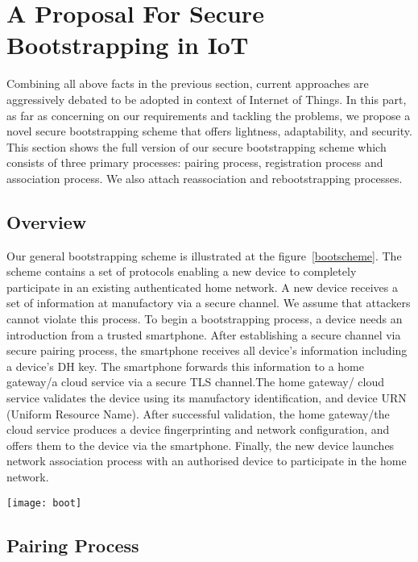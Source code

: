 \section{A Proposal For Secure Bootstrapping in IoT}\label{proposal}

Combining all above facts in the previous section, current approaches are aggressively debated to be adopted in context of Internet of Things. In this part, as far as concerning on our requirements and tackling the problems, we propose a novel secure bootstrapping scheme that offers lightness, adaptability,  and security. This section shows the full version of our secure bootstrapping scheme which consists of three primary processes: pairing process, registration process and association process. We also attach reassociation and rebootstrapping processes.
 
\subsection{Overview}

Our general bootstrapping scheme is illustrated at the figure~\ref{bootscheme}. The scheme contains a set of protocols enabling a new device to completely participate in an existing authenticated home network. A new device receives a set of information at manufactory via a secure channel. We assume that attackers cannot violate this process. To begin a bootstrapping process, a device needs an introduction from a trusted smartphone. After establishing a secure channel via secure pairing process, the smartphone receives all device's information including a device's DH key. The smartphone forwards this information to a home gateway/a cloud service via a secure TLS channel.The home gateway/ cloud service validates the device using its manufactory identification, and device URN (Uniform Resource Name). After successful validation, the home gateway/the cloud service produces a device fingerprinting and network configuration, and offers them to the device via the smartphone. Finally, the new device launches network association process with an authorised device to participate in the home network. 

\begin{figure*}
  \centering
  \texttt{[image: boot]}
  \caption{Secure Bootstrapping Scheme}
  \label{bootscheme}
\end{figure*}

\subsection{Pairing Process}

